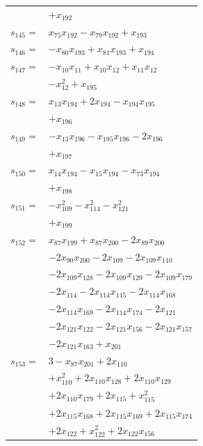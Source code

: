 \begin{longtable}{@{}r@{\;}l@{}}
 & \(\displaystyle +x_{192}\) \\[3pt]
\(s_{145}=\) & \(\displaystyle x_{75}x_{192} -x_{79}x_{192} +x_{193}\) \\[3pt]
\(s_{146}=\) & \(\displaystyle -x_{80}x_{193} +x_{81}x_{193} +x_{194}\) \\[3pt]
\(s_{147}=\) & \(\displaystyle -x_{10}x_{11} +x_{10}x_{12} +x_{11}x_{12}\) \\
 & \(\displaystyle -x_{12}^{2} +x_{195}\) \\[3pt]
\(s_{148}=\) & \(\displaystyle x_{13}x_{194} +2x_{194} -x_{194}x_{195}\) \\
 & \(\displaystyle +x_{196}\) \\[3pt]
\(s_{149}=\) & \(\displaystyle -x_{13}x_{196} -x_{195}x_{196} -2x_{196}\) \\
 & \(\displaystyle +x_{197}\) \\[3pt]
\(s_{150}=\) & \(\displaystyle x_{14}x_{194} -x_{15}x_{194} -x_{73}x_{194}\) \\
 & \(\displaystyle +x_{198}\) \\[3pt]
\(s_{151}=\) & \(\displaystyle -x_{109}^{2} -x_{114}^{2} -x_{121}^{2}\) \\
 & \(\displaystyle +x_{199}\) \\[3pt]
\(s_{152}=\) & \(\displaystyle x_{87}x_{199} +x_{87}x_{200} -2x_{89}x_{200}\) \\
 & \(\displaystyle -2x_{90}x_{200} -2x_{109} -2x_{109}x_{110}\) \\
 & \(\displaystyle -2x_{109}x_{128} -2x_{109}x_{129} -2x_{109}x_{179}\) \\
 & \(\displaystyle -2x_{114} -2x_{114}x_{115} -2x_{114}x_{168}\) \\
 & \(\displaystyle -2x_{114}x_{169} -2x_{114}x_{174} -2x_{121}\) \\
 & \(\displaystyle -2x_{121}x_{122} -2x_{121}x_{156} -2x_{121}x_{157}\) \\
 & \(\displaystyle -2x_{121}x_{163} +x_{201}\) \\[3pt]
\(s_{153}=\) & \(\displaystyle 3 -x_{87}x_{201} +2x_{110}\) \\
 & \(\displaystyle +x_{110}^{2} +2x_{110}x_{128} +2x_{110}x_{129}\) \\
 & \(\displaystyle +2x_{110}x_{179} +2x_{115} +x_{115}^{2}\) \\
 & \(\displaystyle +2x_{115}x_{168} +2x_{115}x_{169} +2x_{115}x_{174}\) \\
 & \(\displaystyle +2x_{122} +x_{122}^{2} +2x_{122}x_{156}\) \\

\end{longtable}
